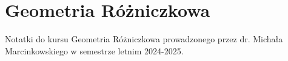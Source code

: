 \chapter{Geometria Różniczkowa}

Notatki do kursu Geometria Różniczkowa prowadzonego przez dr. Michała Marcinkowskiego w semestrze letnim 2024-2025.




